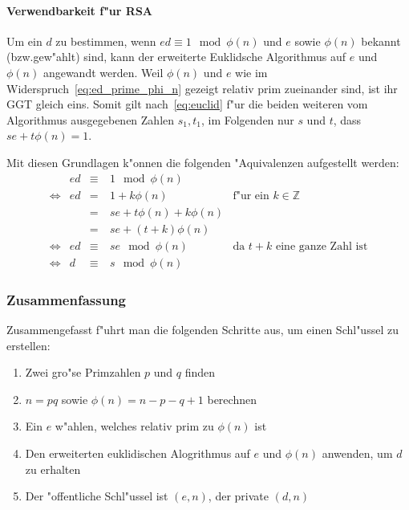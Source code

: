 \documentclass[12pt]{article}
\begin{document}
\paragraph{Verwendbarkeit f"ur RSA}

Um ein $d$ zu bestimmen, wenn $ed \equiv 1 \mod \phi(n) $ und $e$ sowie $\phi(n)$ bekannt (bzw.\@ gew"ahlt) sind,
kann der erweiterte Euklidsche Algorithmus auf $e$ und $\phi(n)$ angewandt werden.
Weil $\phi(n)$ und $e$ wie im Widerspruch~\eqref{eq:ed_prime_phi_n} gezeigt relativ prim zueinander sind, ist ihr GGT gleich eins.
Somit gilt nach~\eqref{eq:euclid} f"ur die beiden weiteren vom Algorithmus ausgegebenen Zahlen $s_1, t_1$,
im Folgenden nur $s$ und $t$, dass $se + t\phi(n) = 1$.

\noindent Mit diesen Grundlagen k"onnen die folgenden "Aquivalenzen aufgestellt werden:
\begin{equation}
\label{eq:d_is_s}
\begin{aligned}
      &ed &\equiv&~1 \mod \phi(n)& \\
      \iff&ed &=&~1 + k \phi(n) &\textrm{f"ur ein }k \in \mathbb{Z}\\
      &&=&~se + t\phi(n) + k\phi(n)& \\
      &&=&~se + (t+k)\phi(n) &\\
      \iff& ed &\equiv&~se \mod \phi(n) &\textrm{da }t+k\textrm{ eine ganze Zahl ist}\\
      \iff& d &\equiv&~s \mod \phi(n)
\end{aligned}
\end{equation}

\subsubsection{Zusammenfassung}

Zusammengefasst f"uhrt man die folgenden Schritte aus, um einen Schl"ussel zu erstellen:

\begin{enumerate}
    \item Zwei gro"se Primzahlen $p$ und $q$ finden
    \item $n = pq$ sowie $\phi(n) = n - p - q + 1$ berechnen
    \item Ein $e$ w"ahlen, welches relativ prim zu $\phi(n)$ ist
    \item Den erweiterten euklidischen Alogrithmus auf $e$ und $\phi(n)$ anwenden, um $d$ zu erhalten
    \item Der "offentliche Schl"ussel ist $(e, n)$, der private $(d, n)$
\end{enumerate}
\end{document}

